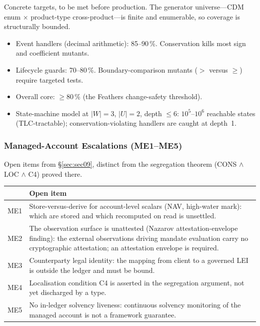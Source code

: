 Concrete targets, to be met before production. The generator universe---CDM enum $\times$ product-type cross-product---is finite and enumerable, so coverage is structurally bounded.

\begin{itemize}[nosep]
\item Event handlers (decimal arithmetic): 85--90\,\%. Conservation kills most sign and coefficient mutants.
\item Lifecycle guards: 70--80\,\%. Boundary-comparison mutants ($>$ versus $\geq$) require targeted tests.
\item Overall core: $\geq 80\,\%$ (the Feathers change-safety threshold).
\item State-machine model at $|W|=3$, $|U|=2$, depth $\leq 6$: $10^5$--$10^6$ reachable states (TLC-tractable); conservation-violating handlers are caught at depth~1.
\end{itemize}

\subsubsection{Managed-Account Escalations (ME1--ME5)}

Open items from \S\ref{sec:sec09}, distinct from the segregation theorem (CONS $\wedge$ LOC $\wedge$ C4) proved there.

\begin{longtable}{@{}p{0.5cm}p{12.6cm}@{}}
\toprule
& \textbf{Open item} \\
\midrule
\endhead
ME1 & Store-versus-derive for account-level scalars (NAV, high-water mark): which are stored and which recomputed on read is unsettled. \\
ME2 & The observation surface is unattested (Nazarov attestation-envelope finding): the external observations driving mandate evaluation carry no cryptographic attestation; an attestation envelope is required. \\
ME3 & Counterparty legal identity: the mapping from client to a governed LEI is outside the ledger and must be bound. \\
ME4 & Localisation condition C4 is asserted in the segregation argument, not yet discharged by a type. \\
ME5 & No in-ledger solvency liveness: continuous solvency monitoring of the managed account is not a framework guarantee. \\
\bottomrule
\end{longtable}

